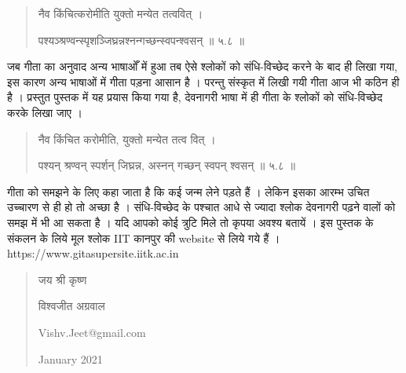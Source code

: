 \begin{quotation}\sanskrit
नैव किंचित्करोमीति युक्तो मन्येत तत्ववित्‌  । 

पश्यञ्श्रण्वन्स्पृशञ्जिघ्रन्नश्नन्गच्छन्स्वपन्श्वसन्‌  ॥ ५.८ ॥  
\end{quotation}
जब गीता का अनुवाद अन्य भाषाओँ में हुआ तब ऐसे श्लोकों को संधि-विच्छेद करने के बाद ही लिखा गया, इस कारण अन्य भाषाओं में गीता पड़ना आसान है ।  परन्तु संस्कृत में लिखी गयी गीता आज भी कठिन ही है ।  प्रस्तुत पुस्तक में यह प्रयास किया गया है, देवनागरी भाषा में ही गीता के श्लोकों को संधि-विच्छेद करके लिखा जाए । 

\begin{quotation}\sanskrit
नैव किंचित करोमीति, युक्तो मन्येत तत्व वित्‌  । 

पश्यन् श्रण्वन् स्पर्शन् जिघ्रन्न, अस्नन् गच्छन् स्वपन् श्वसन्‌  ॥ ५.८ ॥ 
\end{quotation}
गीता को समझने के लिए कहा जाता है कि कई जन्म लेने पड़ते हैं ।  लेकिन इसका आरम्भ उचित उच्चारण से ही हो तो अच्छा है ।  संधि-विच्छेद के पश्चात आधे से ज्यादा श्लोक देवनागरी पढ़ने वालों को समझ में भी आ सकता है ।  यदि आपको कोई त्रुटि मिले तो कृपया अवश्य बतायें । 
इस पुस्तक के संकलन के लिये मूल श्लोक \textrm{IIT} कानपुर की \textrm{website} से लिये गये हैं ।  \textrm{https://www.gitasupersite.iitk.ac.in}

\begin{quotation}
जय श्री कृष्ण

विश्वजीत अग्रवाल 

\textrm{Vishv.Jeet@gmail.com}

\textrm{January 2021}
\end{quotation}
